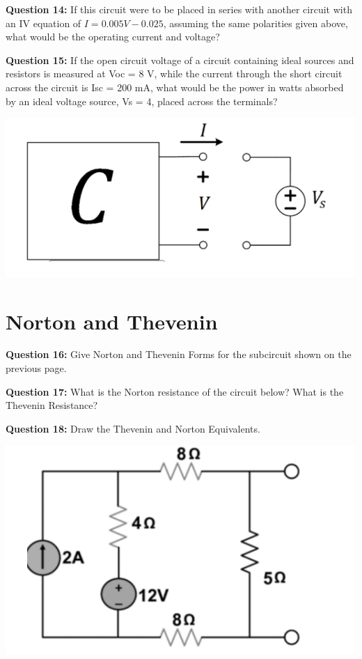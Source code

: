 \documentclass{article}
\begin{document}
\textbf{Question 14:} If this circuit were to be placed in series with another circuit with an IV equation of \(I = 0.005V - 0.025\), assuming the same polarities given above, what would be the operating current and voltage?

\textbf{Question 15:} If the open circuit voltage of a circuit containing ideal sources and resistors is measured at Voc = 8 V, while the current through the short circuit across the circuit is Isc = 200 mA, what would be the power in watts absorbed by an ideal voltage source, Vs = 4, placed across the terminals?

\begin{center}
    \includegraphics[width=0.75\linewidth]{figures/14.png}

\end{center}

\section*{Norton and Thevenin}
\textbf{Question 16:} Give Norton and Thevenin Forms for the subcircuit shown on the previous page.

\textbf{Question 17:} What is the Norton resistance of the circuit below? What is the Thevenin Resistance?

\textbf{Question 18:} Draw the Thevenin and Norton Equivalents.

\begin{center}
    \includegraphics[width=0.75\linewidth]{figures/23.png}

\end{center}
\end{document}
